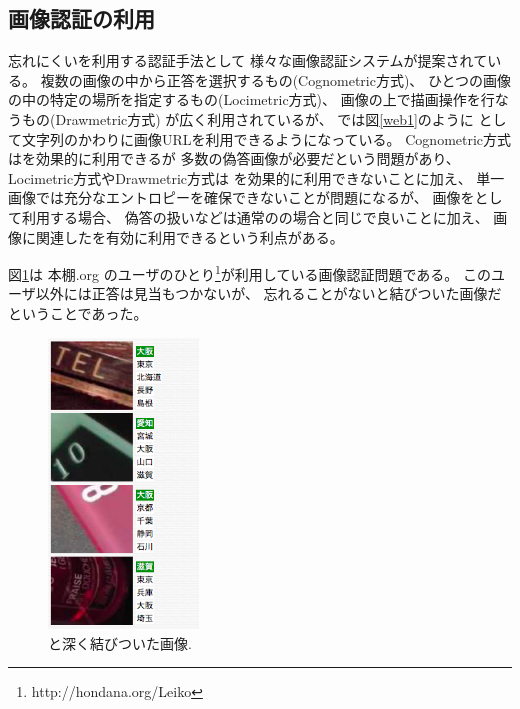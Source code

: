 \documentclass[twoside]{wiss}
\begin{document}
\subsection{画像認証の利用}

忘れにくい{\EM}を利用する認証手法として
様々な画像認証システム\cite{GraphicalPasswords}\cite{小池英樹:2006-05-15}が提案されている。
複数の画像の中から正答を選択するもの(Cognometric方式)、
ひとつの画像の中の特定の場所を指定するもの(Locimetric方式)、
画像の上で描画操作を行なうもの(Drawmetric方式)
が広く利用されているが\cite{GraphicalPasswords}\cite{Guideline}、
{\EP}では図\ref{web1}のように
{\SQ}として文字列のかわりに画像URLを利用できるようになっている。
%
Cognometric方式は{\EM}を効果的に利用できるが
多数の偽答画像が必要だという問題があり、
Locimetric方式やDrawmetric方式は
{\EM}を効果的に利用できないことに加え、
単一画像では充分なエントロピーを確保できないことが問題になる\cite{xxxxx}が、
画像を{\SQ}として利用する場合、
偽答の扱いなどは通常の{\SQ}の場合と同じで良いことに加え、
画像に関連した{\EM}を有効に利用できるという利点がある。


図\ref{leiko}は
本棚.org\cite{hondana}\cite{hondanaorg}
のユーザのひとり\footnote{
  \textsf{http://hondana.org/Leiko}
}が利用している画像認証問題である。
このユーザ以外には正答は見当もつかないが、
忘れることがない{\EP}と結びついた画像だということであった。

\begin{figure}[H]
\centerline{\includegraphics[width=40mm,bb=0 0 221 426]{figures/5a26c3b31834ddeb04edf4593b891647.png}}
\caption{{\EM}と深く結びついた画像.}
\label{leiko}
\end{figure}
\end{document}
